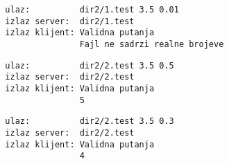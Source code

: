 \documentclass[]{article}
\begin{document}
\begin{enumerate}
  \noindent
  \begin{lstlisting}
  ulaz:          dir2/1.test 3.5 0.01
  izlaz server:  dir2/1.test
  izlaz klijent: Validna putanja
                 Fajl ne sadrzi realne brojeve
  \end{lstlisting}
  \begin{lstlisting}
  ulaz:          dir2/2.test 3.5 0.5
  izlaz server:  dir2/2.test
  izlaz klijent: Validna putanja
                 5
  \end{lstlisting}
  \begin{lstlisting}
  ulaz:          dir2/2.test 3.5 0.3
  izlaz server:  dir2/2.test
  izlaz klijent: Validna putanja
                 4
  \end{lstlisting}

\end{enumerate}
\end{document}
